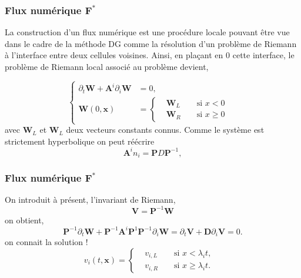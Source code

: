 \documentclass[9pt]{beamer}
\begin{document}
\begin{frame}
\frametitle{Flux numérique $\mathbf{F}^*$}
La construction d'un flux numérique est une procédure locale pouvant être vue dans le cadre de la méthode DG comme la résolution d'un problème de Riemann à l'interface entre deux cellules voisines. Ainsi, en plaçant en $0$ cette interface, le problème de Riemann local associé au problème devient,

\begin{equation}
\label{Riem}
\left\{
\begin{aligned}
\partial_t \mathbf{W} + \mathbf{A}^i \partial_i \mathbf{W} &= 0,\\
\mathbf{W}(0,\mathbf{x}) &= \left\{
\begin{aligned}
&\mathbf{W}_L& &\mbox{ si } x < 0&\\
&\mathbf{W}_R& &\mbox{ si } x \geq 0&
\end{aligned}
\right.
\end{aligned}
\right.
\end{equation}
avec $\mathbf{W}_L$ et $\mathbf{W}_L$ deux vecteurs constants connus. Comme le système est strictement hyperbolique on peut réécrire 
\begin{equation}
\mathbf{A}^i n_i=\mathbf{P}D\mathbf{P}^{-1},
\end{equation}

\end{frame}


\begin{frame}
\frametitle{Flux numérique $\mathbf{F}^*$}
On introduit à présent, l'invariant de Riemann,
\begin{equation}
\mathbf{V} = \mathbf{P}^{-1}\mathbf{W}
\end{equation}
on obtient,
\begin{equation}
\mathbf{P}^{-1} \partial_t \mathbf{W} + \mathbf{P}^{-1} \mathbf{A}^i \mathbf{P}^{1}\mathbf{P}^{-1}   \partial_i \mathbf{W} = \partial_t \mathbf{V} + \mathbf{D} \partial_i \mathbf{V}  = 0.
\end{equation}
on connait la solution !
\begin{equation}
v_i(t,\mathbf{x}) = \left\{
\begin{aligned}
&v_{i,L}& &\mbox{ si } x < \lambda_it,&\\
&v_{i,R}& &\mbox{ si } x \geq \lambda_it.&
\end{aligned}
\right.
\end{equation}


\end{frame}
\end{document}
